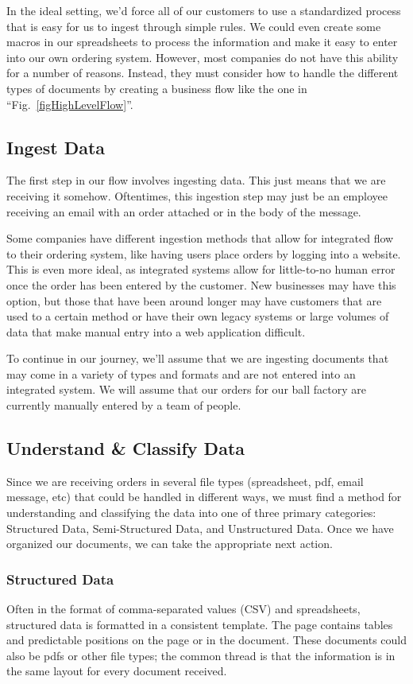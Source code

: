 \documentclass[conference]{IEEEtran}
\begin{document}
In the ideal setting, we'd force all of our customers to use a standardized process that is easy for us to ingest through simple rules. We could even create some macros in our spreadsheets to process the information and make it easy to enter into our own ordering system. However, most companies do not have this ability for a number of reasons. Instead, they must consider how to handle the different types of documents by creating a business flow like the one in ``Fig.~\ref{figHighLevelFlow}''.

\subsection{Ingest Data}
The first step in our flow involves ingesting data. This just means that we are receiving it somehow. Oftentimes, this ingestion step may just be an employee receiving an email with an order attached or in the body of the message.

Some companies have different ingestion methods that allow for integrated flow to their ordering system, like having users place orders by logging into a website. This is even more ideal, as integrated systems allow for little-to-no human error once the order has been entered by the customer. New businesses may have this option, but those that have been around longer may have customers that are used to a certain method or have their own legacy systems or large volumes of data that make manual entry into a web application difficult.

To continue in our journey, we'll assume that we are ingesting documents that may come in a variety of types and formats and are not entered into an integrated system. We will assume that our orders for our ball factory are currently manually entered by a team of people.

\subsection{Understand \& Classify Data}
Since we are receiving orders in several file types (spreadsheet, pdf, email message, etc) that could be handled in different ways, we must find a method for understanding and classifying the data into one of three primary categories: Structured Data, Semi-Structured Data, and Unstructured Data. Once we have organized our documents, we can take the appropriate next action.

\subsubsection{Structured Data}
Often in the format of comma-separated values (CSV) and spreadsheets, structured data is formatted in a consistent template. The page contains tables and predictable positions on the page or in the document. These documents could also be pdfs or other file types; the common thread is that the information is in the same layout for every document received.
\end{document}
